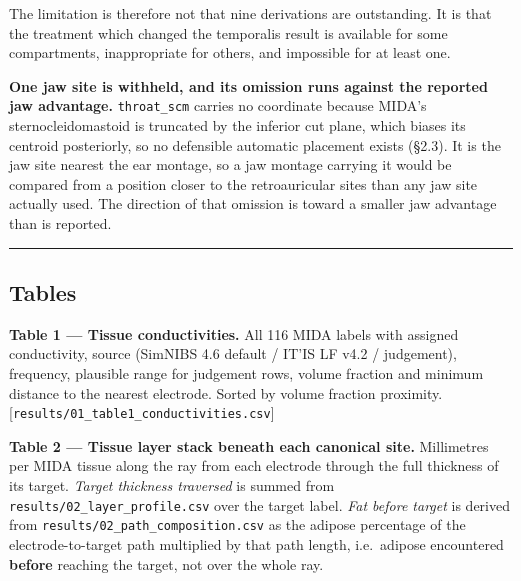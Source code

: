 \documentclass[
  11pt,
  letterpaper,
]{article}
\begin{document}
The limitation is therefore not that nine derivations are outstanding. It is that
the treatment which changed the temporalis result is available for some
compartments, inappropriate for others, and impossible for at least one.

\textbf{One jaw site is withheld, and its omission runs against the reported jaw
advantage.} \texttt{throat\_scm} carries no coordinate because MIDA's
sternocleidomastoid is truncated by the inferior cut plane, which biases its
centroid posteriorly, so no defensible automatic placement exists (\S{}2.3). It is
the jaw site nearest the ear montage, so a jaw montage carrying it would be
compared from a position closer to the retroauricular sites than any jaw site
actually used. The direction of that omission is toward a smaller jaw advantage
than is reported.

\begin{center}\rule{0.5\linewidth}{0.5pt}\end{center}

\subsection{Tables}\label{tables}

\textbf{Table 1 --- Tissue conductivities.} All 116 MIDA labels with assigned
conductivity, source (SimNIBS 4.6 default / IT'IS LF v4.2 / judgement),
frequency, plausible range for judgement rows, volume fraction and minimum
distance to the nearest electrode. Sorted by volume fraction \texttimes{} proximity.
{[}\texttt{results/01\_table1\_conductivities.csv}{]}

\textbf{Table 2 --- Tissue layer stack beneath each canonical site.} Millimetres per
MIDA tissue along the ray from each electrode through the full thickness of its
target. \emph{Target thickness traversed} is summed from \texttt{results/02\_layer\_profile.csv}
over the target label. \emph{Fat before target} is derived from
\texttt{results/02\_path\_composition.csv} as the adipose percentage of the
electrode-to-target path multiplied by that path length, i.e.~adipose
encountered \textbf{before} reaching the target, not over the whole ray.
\end{document}

